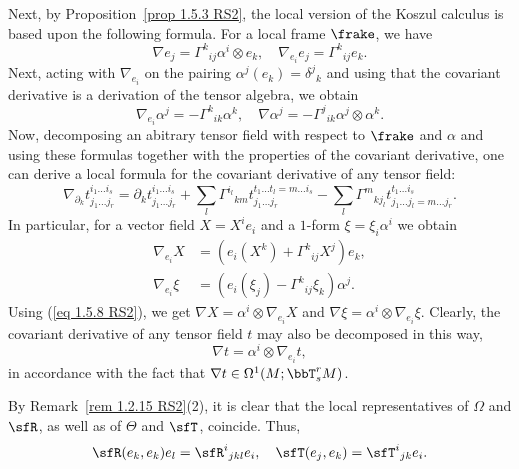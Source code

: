 Next, by Proposition~\ref{prop 1.5.3 RS2}, the local version of the Koszul calculus is based upon the following formula. For a local frame $\frake$, we have 
\[\nabla e_j=\Gamma^k{}_{ij}\alpha^i\otimes e_k, \quad \nabla_{e_i}e_j=\Gamma^k{}_{ij}e_k. \label{eq 2.1.45/46 RS2}\]
Next, acting with $\nabla_{e_i}$ on the pairing $\alpha^j(e_k)=\delta^j{}_k$ and using that the covariant derivative is a derivation of the tensor algebra, we obtain 
\[\nabla_{e_i}\alpha^j=-\Gamma^k{}_{ik}\alpha^k,\quad \nabla\alpha^j=-\Gamma^j{}_{ik}\alpha^j\otimes\alpha^k.\label{eq 2.1.47/48 RS2}\]
Now, decomposing an abitrary tensor field with respect to $\frake$ and $\alpha$ and using these formulas together with the properties of the covariant derivative, one can derive a local formula for the covariant derivative of any tensor field:
\[\nabla_{\partial_k}t_{j_1\ldots j_r}^{i_1\ldots i_s}=\partial_kt_{j_1\ldots j_r}^{i_1\ldots i_s}+\sum_l\Gamma^{i_l}{}_{km}t_{j_1\ldots j_r}^{t_1\ldots t_l=m\ldots i_s}-
\sum_l\Gamma^{m}{}_{kj_l}t_{j_1\ldots j_l=m\ldots  j_r}^{t_1\ldots i_s}.
\]
In particular, for a vector field $X=X^i e_i$ and a $1$-form $\xi=\xi_i\alpha^i$ we obtain 
\begin{align}
    \nabla_{e_i}X&=(e_i(X^k)+\Gamma^k{}_{ij}X^j)e_k,\label{eq 2.1.49 RS2}\\
    \nabla_{e_i}\xi&=(e_i(\xi_j)-\Gamma^k{}_{ij}\xi_k)\alpha^j.\label{eq 2.1.50 RS2}
\end{align}
Using (\ref{eq 1.5.8 RS2}), we get $\nabla X=\alpha^i\otimes\nabla_{e_i}X$ and $\nabla\xi=\alpha^i\otimes\nabla_{e_i}\xi$. Clearly, the covariant derivative of any tensor field $t$ may also be decomposed in this way,
\[\nabla t=\alpha^i\otimes \nabla_{e_i} t,\]
in accordance with the fact that $\nabla t\in\Omega^1(M;\bbT^r_s M)$.

\begin{rem}\label{rem 2.1.28 RS2}
    By Remark~\ref{rem 1.2.15 RS2}(2), it is clear that the local representatives of $\Omega$ and $\sfR$, as well as of $\Theta$ and $\sfT$, coincide. Thus,
    \[\sfR(e_k,e_k)e_l=\sfR^i{}_{jkl}e_i,\quad \sfT(e_j,e_k)=\sfT^i{}_{jk}e_i.\]
\end{rem}

